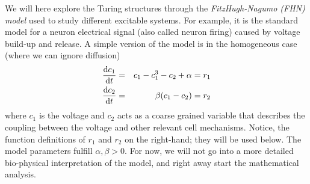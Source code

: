 We will here explore the Turing structures through the \emph{FitzHugh-Nagumo (FHN) model} 
used to study different excitable systems. For example, 
it is the standard model for a neuron electrical signal (also called neuron firing) caused 
by voltage build-up and release. A simple version of the model is 
in the homogeneous case (where we can ignore diffusion)
\begin{eqnarray}
	\label{eq:fhn1}
	\frac{\mathrm{d} c_1}{\mathrm{d} t} &=& c_1 - c_1^3 - c_2 + \alpha = r_1\\
	\label{eq:fhn2}
	\frac{\mathrm{d} c_2}{\mathrm{d} t} &=& \beta(c_1 - c_2) = r_2
\end{eqnarray}
where $c_1$ is the voltage and $c_2$ acts as a coarse grained variable that describes the 
coupling between the voltage and other relevant cell mechanisms. Notice, the function definitions 
of $r_1$ and $r_2$ on the right-hand; they will be used below. 
The model parameters fulfill $\alpha, \beta > 0$. For now, we will not go into a 
more detailed bio-physical interpretation of the model, and right away
start the mathematical analysis. 

